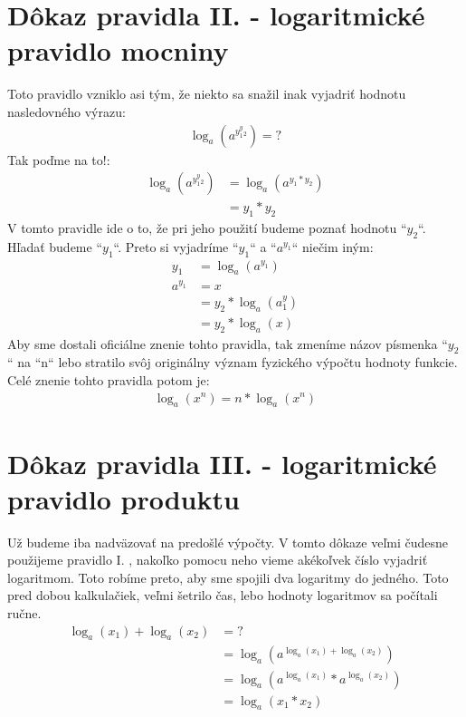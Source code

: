 \documentclass{article}
\begin{document}
\section*{Dôkaz pravidla II. - logaritmické pravidlo mocniny}
Toto pravidlo vzniklo asi tým, že niekto sa snažil inak vyjadriť hodnotu nasledovného výrazu: \\
\begin{align}
	\log_a(a^{y_1^y_2}) = ?
\end{align}
Tak poďme na to!: \\
\begin{align}
	\log_a(a^{y_1^y_2}) & = \log_a(a^{y_1 * y_2}) \\
	& = y_1 * y_2 \tag{použili sme I.}
\end{align}
V tomto pravidle ide o to, že pri jeho použití budeme poznať hodnotu ``$y_2$``. Hľadať budeme ``$y_1$``.
Preto si vyjadríme ``$y_1$`` a ``$a^{y_1}$`` niečim iným: \\
\begin{align}
	y_1 & = \log_a(a^{y_1}) \\
	a^{y_1} & = x \\
	& = y_2 * \log_a(a^y_1) \\
	& = y_2 * \log_a(x)
\end{align}
Aby sme dostali oficiálne znenie tohto pravidla, tak zmeníme názov písmenka ``$y_2$`` na ``n`` lebo stratilo svôj originálny význam fyzického výpočtu hodnoty funkcie. Celé znenie tohto pravidla potom je: \\
\begin{align}
	\log_a(x^n) = n * \log_a(x^n)
\end{align}


\section*{Dôkaz pravidla III. - logaritmické pravidlo produktu}
Už budeme iba nadväzovať na predošlé výpočty. V tomto dôkaze veľmi čudesne použijeme pravidlo I. , nakoľko pomocu neho vieme akékoľvek číslo vyjadriť logaritmom. Toto robíme preto, aby sme spojili dva logaritmy do jedného.
Toto pred dobou kalkulačiek, veľmi šetrilo čas, lebo hodnoty logaritmov sa počítali ručne.\\
\begin{align}
\log_a(x_1) + \log_a(x_2) & = ? \\
	& = \log_a(a^{\log_a(x_1) + \log_a(x_2)}) \tag{spomenutá magická premena}\\
	& = \log_a(a^{\log_a(x_1)} * a^{\log_a(x_2)})  \\
	& = \log_a(x_1 * x_2) \tag{Znovu I.}
\end{align}
\end{document}
